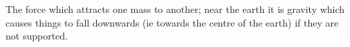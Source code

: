 The force which attracts one mass to another; near
the earth it is gravity which causes things to fall 
downwards (ie towards the centre of the earth) if they
are not supported.